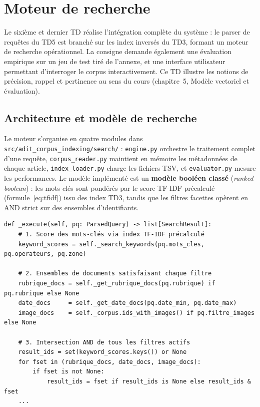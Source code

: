 \chapter{Moteur de recherche}
\label{chap:td6}

Le sixième et dernier TD réalise l'intégration complète du système : le parser de requêtes
du TD5 est branché sur les index inversés du TD3, formant un moteur de recherche
opérationnel. La consigne demande également une évaluation empirique sur un jeu de test
tiré de l'annexe, et une interface utilisateur permettant d'interroger le corpus
interactivement. Ce TD illustre les notions de précision, rappel et pertinence au sens
du cours (chapitre~5, Modèle vectoriel et évaluation).

\section{Architecture et modèle de recherche}

Le moteur s'organise en quatre modules dans \texttt{src/adit\_corpus\_indexing/search/} :
\texttt{engine.py} orchestre le traitement complet d'une requête, \texttt{corpus\_reader.py}
maintient en mémoire les métadonnées de chaque article, \texttt{index\_loader.py} charge
les fichiers TSV, et \texttt{evaluator.py} mesure les performances. Le modèle implémenté
est un \textbf{modèle booléen classé} (\emph{ranked boolean}) : les mots-clés sont
pondérés par le score TF-IDF précalculé (formule~\ref{eq:tfidf}) issu des index TD3,
tandis que les filtres facettes opèrent en AND strict sur des ensembles d'identifiants.

\begin{lstlisting}[caption={Exécution d'une requête : scoring puis intersection des filtres},
  label={lst:engine_execute}]
def _execute(self, pq: ParsedQuery) -> list[SearchResult]:
    # 1. Score des mots-clés via index TF-IDF précalculé
    keyword_scores = self._search_keywords(pq.mots_cles, pq.operateurs, pq.zone)

    # 2. Ensembles de documents satisfaisant chaque filtre
    rubrique_docs = self._get_rubrique_docs(pq.rubrique) if pq.rubrique else None
    date_docs     = self._get_date_docs(pq.date_min, pq.date_max)
    image_docs    = self._corpus.ids_with_images() if pq.filtre_images else None

    # 3. Intersection AND de tous les filtres actifs
    result_ids = set(keyword_scores.keys()) or None
    for fset in (rubrique_docs, date_docs, image_docs):
        if fset is not None:
            result_ids = fset if result_ids is None else result_ids & fset
    ...
\end{lstlisting}

